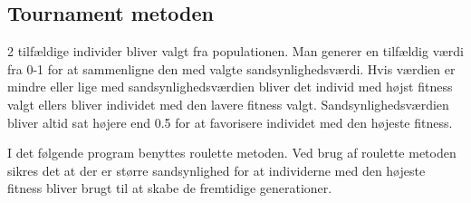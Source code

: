 \subsection{Tournament metoden}

2 tilfældige individer bliver valgt fra populationen. Man generer en tilfældig værdi fra 0-1 for at sammenligne den med valgte sandsynlighedsværdi. Hvis værdien er mindre eller lige med sandsynlighedsværdien bliver det individ med højst fitness valgt ellers bliver individet med den lavere fitness valgt. Sandsynlighedsværdien bliver altid sat højere end 0.5 for at favorisere individet med den højeste fitness. 

I det følgende program benyttes roulette metoden. Ved brug af roulette metoden sikres det at der er større sandsynlighed for at individerne med den højeste fitness bliver brugt til at skabe de fremtidige generationer. 
